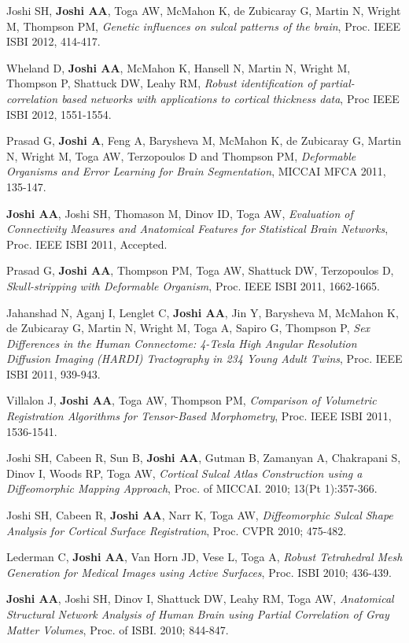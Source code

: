 \documentclass[overlapped,line,letterpaper]{res}
\begin{document}
\begin{resume}
Joshi SH, \textbf{Joshi AA}, Toga AW, McMahon K, de Zubicaray G, Martin N, Wright M, Thompson PM, \textit{Genetic influences on sulcal patterns of the brain}, Proc. IEEE ISBI 2012, 414-417.

Wheland D, \textbf{Joshi AA}, McMahon K, Hansell N, Martin N, Wright M, Thompson P, Shattuck DW, Leahy RM, \textit{Robust identification of partial-correlation based networks with applications to cortical thickness data}, Proc IEEE ISBI 2012, 1551-1554.

Prasad  G, \textbf{Joshi A}, Feng A, Barysheva M, McMahon K, de Zubicaray G, Martin N, Wright M, Toga AW, Terzopoulos D and Thompson PM, \textit{Deformable Organisms and Error Learning for Brain Segmentation}, MICCAI MFCA 2011, 135-147.

\textbf{Joshi AA}, Joshi SH, Thomason M, Dinov ID, Toga AW, \textit{Evaluation of Connectivity Measures and Anatomical Features for Statistical Brain Networks}, Proc. IEEE ISBI 2011, Accepted. 

Prasad G, \textbf{Joshi AA}, Thompson PM, Toga AW, Shattuck DW, Terzopoulos D, \textit{Skull-stripping with Deformable Organism}, Proc. IEEE ISBI 2011, 1662-1665. 

Jahanshad N, Aganj I, Lenglet C, \textbf{Joshi AA}, Jin Y, Barysheva M, McMahon K, de Zubicaray G, Martin N, Wright M, Toga A, Sapiro G, Thompson P, \textit{Sex Differences in the Human Connectome: 4-Tesla High Angular Resolution Diffusion Imaging (HARDI) Tractography in 234 Young Adult Twins}, Proc. IEEE ISBI 2011, 939-943.

Villalon J, \textbf{Joshi AA}, Toga AW, Thompson PM, \textit{Comparison of Volumetric Registration Algorithms for Tensor-Based Morphometry}, Proc. IEEE ISBI 2011, 1536-1541. 

Joshi SH, Cabeen R, Sun B, \textbf{Joshi AA}, Gutman B, Zamanyan A, Chakrapani S, Dinov I, Woods RP, Toga AW, \textit{Cortical Sulcal Atlas Construction using a Diffeomorphic Mapping Approach}, Proc. of MICCAI. 2010; 13(Pt 1):357-366.

Joshi SH, Cabeen R, \textbf{Joshi AA}, Narr K, Toga AW, \textit{Diffeomorphic Sulcal Shape Analysis for Cortical Surface Registration}, Proc. CVPR 2010; 475-482.

Lederman C, \textbf{Joshi AA}, Van Horn JD, Vese L, Toga A, \textit{Robust Tetrahedral Mesh Generation for Medical Images using Active Surfaces}, Proc. ISBI 2010; 436-439.

\textbf{Joshi AA}, Joshi SH, Dinov I, Shattuck DW, Leahy RM, Toga AW, \textit{Anatomical Structural Network Analysis of Human Brain using Partial Correlation of Gray Matter Volumes}, Proc. of ISBI. 2010; 844-847.


\end{resume}
\end{document}
